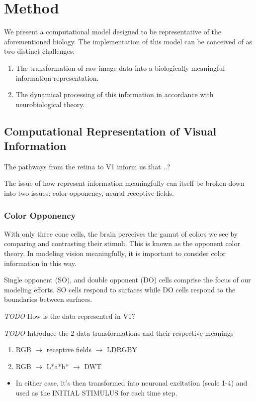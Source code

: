 \documentclass[journal,onecolumn]{IEEEtran}
\begin{document}
\section{Method}

We present a computational model designed to be representative of the aforementioned biology. The implementation of this model can be conceived of as two distinct challenges:
\begin{enumerate}
    \item The transformation of raw image data into a biologically meaningful information representation.
    \item The dynamical processing of this information in accordance with neurobiological theory.
\end{enumerate}


\subsection*{Computational Representation of Visual Information}

The pathways from the retina to V1 inform us that ..?

The issue of how represent information meaningfully can itself be broken down into two issues: color opponency, neural receptive fields.

\subsubsection*{Color Opponency} With only three cone cells, the brain perceives the gamut of colors we see by comparing and contrasting their stimuli. This is known as the opponent color theory. In modeling vision meaningfully, it is important to consider color information in this way.

Single opponent (SO), and double opponent (DO) cells comprise the focus of our modeling efforts. SO cells respond to surfaces while DO cells respond to the boundaries between surfaces.

\textit{TODO} How is the data represented in V1?

\textit{TODO} Introduce the 2 data transformations and their respective meanings

\begin{enumerate}
    \item RGB $\rightarrow$ receptive fields $\rightarrow$ LDRGBY
    \item RGB $\rightarrow$ L*a*b* $\rightarrow$ DWT
\end{enumerate}
\begin{itemize}
    \item In either case, it's then transformed into neuronal excitation (scale 1-4) and used as the INITIAL STIMULUS for each time step.
\end{itemize}
\end{document}
